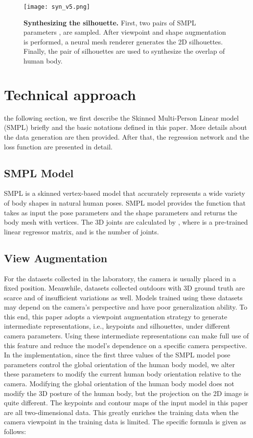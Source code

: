 \documentclass[journal]{IEEEtran}
\begin{document}
\begin{figure*}[!htp]
    \centerline{\texttt{[image: syn\_v5.png]}}
    \caption{\textbf{Synthesizing the silhouette.} First, two pairs of SMPL parameters , are sampled. After viewpoint and shape augmentation is performed, a neural mesh renderer generates the 2D silhouettes. Finally, the pair of silhouettes are used to synthesize the overlap of human body.}
    \label{fig:syn_input}
\end{figure*}



\quad 

\section{Technical approach}
 the following section, we first describe the Skinned Multi-Person Linear model (SMPL) briefly and the basic notations defined in this paper. More details about the data generation are then provided. After that, the regression network and the loss function are presented in detail.

\subsection{SMPL Model}
 SMPL is a skinned vertex-based model that accurately represents a wide variety of body shapes in natural human poses. SMPL model provides the function  that takes as input the pose parameters  and the shape parameters  and returns the body mesh  with  vertices. The 3D joints are calculated by , where  is a pre-trained linear regressor matrix, and  is the number of joints.  
\subsection{View Augmentation}

For the datasets collected in the laboratory, the camera is usually placed in a fixed position. Meanwhile, datasets collected outdoors with 3D ground truth are scarce and of insufficient variations as well. Models trained using these datasets may depend on the camera's perspective and have poor generalization ability. To this end, this paper adopts a viewpoint augmentation strategy to generate intermediate representations, i.e., keypoints and silhouettes, under different camera parameters. Using these intermediate representations can make full use of this feature and reduce the model's dependence on a specific camera perspective. In the implementation, since the first three values of the SMPL model pose parameters control the global orientation of the human body model, we alter these parameters to modify the current human body orientation relative to the camera. Modifying the global orientation of the human body model does not modify the 3D posture of the human body, but the projection on the 2D image is quite different. The keypoints and contour maps of the input model in this paper are all two-dimensional data. This greatly enriches the training data when the camera viewpoint in the training data is limited. The specific formula is given as follows:
\end{document}
